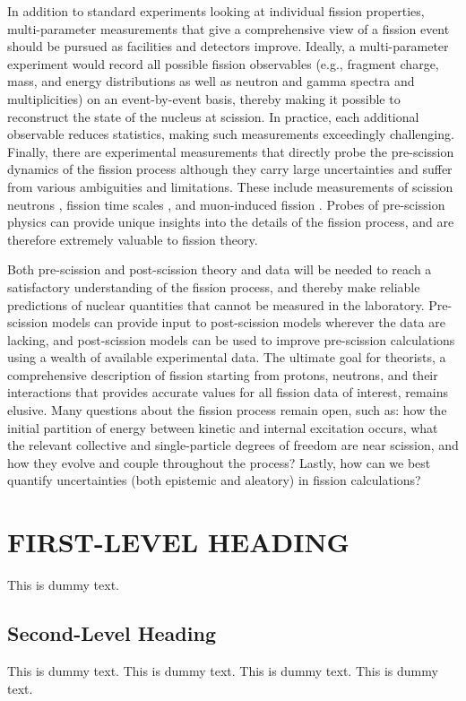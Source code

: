 \documentclass[letterpaper]{ar-1col}
\begin{document}
In addition to standard experiments looking at individual fission properties, multi-parameter measurements that give a comprehensive view of a fission event should be pursued as facilities and detectors improve. Ideally, a multi-parameter experiment would record all possible fission observables (e.g., fragment charge, mass, and energy distributions as well as neutron and gamma spectra and multiplicities) on an event-by-event basis, thereby making it possible to reconstruct the state of the nucleus at scission. In practice, each additional observable reduces statistics, making such measurements exceedingly challenging. Finally, there are experimental measurements that directly probe the pre-scission dynamics of the fission process although they carry large uncertainties and suffer from various ambiguities and limitations. These include measurements of scission neutrons \cite{Pe09}, fission time scales \cite{Jac09}, and muon-induced fission \cite{Mar80}. Probes of pre-scission physics can provide unique insights into the details of the fission process, and are therefore extremely valuable to fission theory.

Both pre-scission and post-scission theory and data will be needed to reach a satisfactory understanding of the fission process, and thereby make reliable predictions of nuclear quantities that cannot be measured in the laboratory. Pre-scission models can provide input to post-scission models wherever the data are lacking, and post-scission models can be used to improve pre-scission calculations using a wealth of available experimental data. The ultimate goal for theorists, a comprehensive description of fission starting from protons, neutrons, and their interactions that provides accurate values for all fission data of interest, remains elusive.  Many questions about the fission process remain open, such as: how the initial partition of energy between kinetic and internal excitation occurs, what the relevant collective and single-particle degrees of freedom are near scission, and how they evolve and couple throughout the process? Lastly, how can we best quantify uncertainties (both epistemic and aleatory) in fission calculations?

\section{FIRST-LEVEL HEADING}
This is dummy text. 
\subsection{Second-Level Heading}
This is dummy text. This is dummy text. This is dummy text. This is dummy text.
\end{document}
